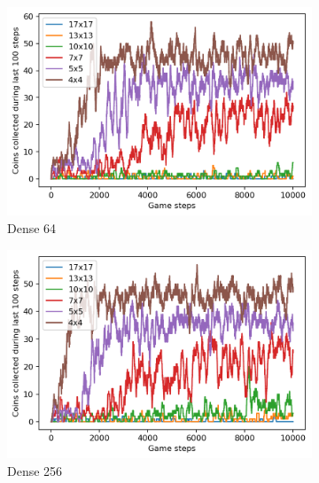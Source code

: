 \begin{figure}
  \centering
  \begin{subfigure}[b]{0.48\linewidth}
    \centering
    	\includegraphics[width=\linewidth]{images/minigame-dense64-arch.png}
    \caption{Dense 64}
    \label{fig:network-dense64}
  \end{subfigure}
  \quad
  \begin{subfigure}[b]{0.48\linewidth}
    \centering
      \includegraphics[width=\linewidth]{images/minigame-dense256-arch.png}
    \caption{Dense 256}
    \label{fig:network-dense256}
  \end{subfigure}
  \begin{subfigure}[b]{0.48\linewidth}
    \centering

\end{subfigure}
\end{figure}
